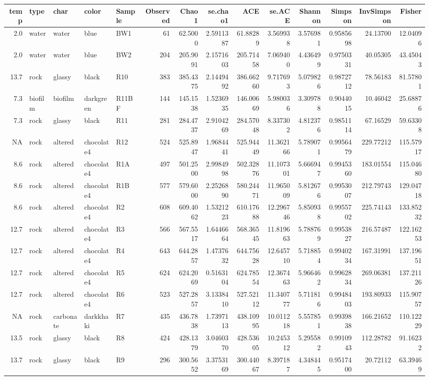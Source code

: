 \documentclass[
]{book}
\begin{document}
\begin{longtable}{rllllrrrrrrrrr}
\toprule
temp & type & char & color & Sample & Observed & Chao1 & se.chao1 & ACE & se.ACE & Shannon & Simpson & InvSimpson & Fisher \\ 
\midrule
2.0 & water & water & blue & BW1 & 61 & 62.5000 & 2.5911387 & 61.88289 & 3.569938 & 3.576981 & 0.9585698 & 24.13700 & 12.04096 \\ 
2.0 & water & water & blue & BW2 & 204 & 205.9091 & 2.1571603 & 205.71458 & 7.069400 & 4.436499 & 0.9750331 & 40.05305 & 43.45043 \\ 
13.7 & rock & glassy & black & R10 & 383 & 385.4375 & 2.1449492 & 386.66260 & 9.717693 & 5.079826 & 0.9872712 & 78.56183 & 81.57801 \\ 
7.3 & biofilm & biofilm & darkgreen & R11BF & 144 & 145.1538 & 1.5236935 & 146.00669 & 5.980036 & 3.309788 & 0.9044015 & 10.46042 & 25.68876 \\ 
7.3 & rock & glassy & black & R11 & 281 & 284.4737 & 2.9104269 & 284.57048 & 8.337302 & 4.812376 & 0.9851114 & 67.16529 & 59.63308 \\ 
NA & rock & altered & chocolate4 & R12 & 524 & 525.8947 & 1.9684441 & 525.94449 & 11.362166 & 5.789071 & 0.9956479 & 229.77212 & 115.57917 \\ 
8.6 & rock & altered & chocolate4 & R1A & 497 & 501.2500 & 2.9984998 & 502.32876 & 11.107301 & 5.666947 & 0.9945360 & 183.01554 & 115.04680 \\ 
8.6 & rock & altered & chocolate4 & R1B & 577 & 579.6000 & 2.2526890 & 580.24471 & 11.965009 & 5.812676 & 0.9953007 & 212.79743 & 129.04718 \\ 
8.6 & rock & altered & chocolate4 & R2 & 608 & 609.4062 & 1.5321223 & 610.17688 & 12.296746 & 5.850938 & 0.9955702 & 225.74143 & 133.85232 \\ 
12.7 & rock & altered & chocolate4 & R3 & 566 & 567.5517 & 1.6446664 & 568.36545 & 11.819663 & 5.788769 & 0.9953827 & 216.57487 & 122.16253 \\ 
12.7 & rock & altered & chocolate4 & R4 & 643 & 644.2857 & 1.4737632 & 644.75628 & 12.645710 & 5.718854 & 0.9940234 & 167.31991 & 137.19651 \\ 
12.7 & rock & altered & chocolate4 & R5 & 624 & 624.2069 & 0.5163104 & 624.78554 & 12.367463 & 5.966462 & 0.9962834 & 269.06381 & 137.21126 \\ 
12.7 & rock & altered & chocolate4 & R6 & 523 & 527.2857 & 3.1338410 & 527.52112 & 11.340777 & 5.711816 & 0.9948403 & 193.80933 & 115.90757 \\ 
NA & rock & carbonate & darkkhaki & R7 & 435 & 436.7838 & 1.7397113 & 438.10995 & 10.011218 & 5.557851 & 0.9939838 & 166.21652 & 110.12229 \\ 
13.5 & rock & glassy & black & R8 & 424 & 428.1379 & 3.0460370 & 428.53605 & 10.245312 & 5.295582 & 0.9910943 & 112.28782 & 91.16232 \\ 
13.7 & rock & glassy & black & R9 & 296 & 300.5652 & 3.3753169 & 300.44067 & 8.397187 & 4.348445 & 0.9517400 & 20.72112 & 63.39469 \\ 
\bottomrule
\end{longtable}
\end{document}

